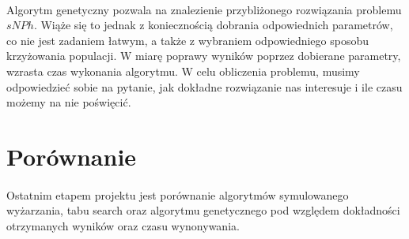 \documentclass[wide,a4paper,titlepage,12pt] {article}
\begin{document}
\paragraph{}
Algorytm genetyczny pozwala na znalezienie przybliżonego rozwiązania problemu $sNPh$. Wiąże się to jednak z koniecznością dobrania odpowiednich parametrów, co nie jest zadaniem łatwym, a także z wybraniem odpowiedniego sposobu krzyżowania populacji. W miarę poprawy wyników poprzez dobierane parametry, wzrasta czas wykonania algorytmu. W celu obliczenia problemu, musimy odpowiedzieć sobie na pytanie, jak dokładne rozwiązanie nas interesuje i ile czasu możemy na nie poświęcić.

\newpage
\section{Porównanie}
\paragraph{} %
Ostatnim etapem projektu jest porównanie algorytmów symulowanego wyżarzania, tabu search oraz algorytmu genetycznego pod względem dokładności otrzymanych wyników oraz czasu wynonywania.

\label{par:}
\end{document}
